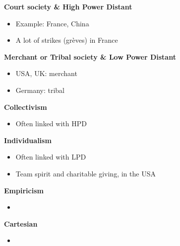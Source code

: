 \documentclass[11pt,a4paper,oneside,french,svgnames]{report}
\begin{document}
\begin{center}
\begin{minipage}[t]{.45\textwidth}
\centering\textbf{Court society \& High Power Distant}\\
  \begin{itemize}
    \item Example: France, China
    \item A lot of strikes (grèves) in France
  \end{itemize}
\end{minipage}
\begin{minipage}[t]{.45\textwidth}
\centering\textbf{Merchant or Tribal society \& Low Power Distant}\\
  \begin{itemize}
    \item USA, UK: merchant
    \item Germany: tribal
  \end{itemize}
\end{minipage}

\begin{minipage}[t]{.45\textwidth}
\centering\textbf{Collectivism}\\
  \begin{itemize}
    \item Often linked with HPD
  \end{itemize}
\end{minipage}
\begin{minipage}[t]{.45\textwidth}
\centering\textbf{Individualism}\\
  \begin{itemize}
    \item Often linked with LPD
    \item Team spirit and charitable giving, in the USA
  \end{itemize}
\end{minipage}

\begin{minipage}[t]{.45\textwidth}
\centering\textbf{Empiricism}\\
  \begin{itemize}
    \item
  \end{itemize}
\end{minipage}
\begin{minipage}[t]{.45\textwidth}
\centering\textbf{Cartesian}\\
  \begin{itemize}
    \item
  \end{itemize}
\end{minipage}


\end{center}
\end{document}
